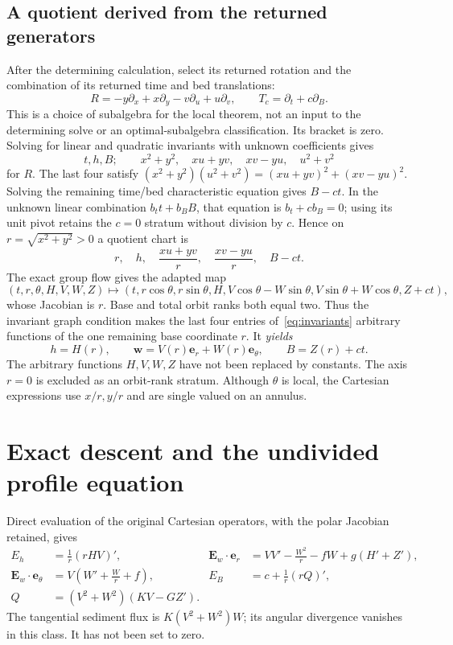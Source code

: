 \documentclass[11pt]{article}
\theoremstyle{remark}\newtheorem{remark}[theorem]{Remark}
\begin{document}
\subsection{A quotient derived from the returned generators}
After the determining calculation, select its returned rotation and the
combination of its returned time and bed translations:
\[
R=-y\partial_x+x\partial_y-v\partial_u+u\partial_v,
\qquad T_c=\partial_t+c\partial_B.
\]
This is a choice of subalgebra for the local theorem, not an input to the
determining solve or an optimal-subalgebra classification. Its bracket is zero.
Solving for linear and quadratic invariants with unknown coefficients gives
\[
t,h,B;\qquad x^2+y^2,\quad xu+yv,\quad xv-yu,\quad u^2+v^2
\]
for $R$. The last four satisfy
$(x^2+y^2)(u^2+v^2)=(xu+yv)^2+(xv-yu)^2$. Solving the remaining time/bed
characteristic equation gives $B-ct$. In the unknown linear combination
$b_t t+b_B B$, that equation is $b_t+cb_B=0$; using its unit pivot retains
the $c=0$ stratum without division by $c$.
Hence on $r=\sqrt{x^2+y^2}>0$ a quotient
chart is
\begin{equation}
r,\quad h,\quad \frac{xu+yv}{r},\quad \frac{xv-yu}{r},\quad B-ct.
\label{eq:invariants}
\end{equation}
The exact group flow gives the adapted map
\[
(t,r,\theta,H,V,W,Z)\longmapsto
(t,r\cos\theta,r\sin\theta,H,
 V\cos\theta-W\sin\theta,V\sin\theta+W\cos\theta,Z+ct),
\]
whose Jacobian is $r$. Base and total orbit ranks both equal two. Thus the
invariant graph condition makes the last four entries of~\eqref{eq:invariants}
arbitrary functions of the one remaining base coordinate $r$. It \emph{yields}
\begin{equation}
h=H(r),\qquad \mathbf w=V(r)\mathbf e_r+W(r)\mathbf e_\theta,
\qquad B=Z(r)+ct.\label{eq:derived-form}
\end{equation}
The arbitrary functions $H,V,W,Z$ have not been replaced by constants.
The axis $r=0$ is excluded as an orbit-rank stratum. Although $\theta$ is local,
the Cartesian expressions use $x/r,y/r$ and are single valued on an annulus.

\section{Exact descent and the undivided profile equation}
Direct evaluation of the original Cartesian operators, with the polar
Jacobian retained, gives
\begin{align}
E_h&=\frac{1}{r}(rHV)',&
\mathbf E_w\cdot\mathbf e_r&=VV'-\frac{W^2}{r}-fW+g(H'+Z'),\label{eq:polar1}\\
\mathbf E_w\cdot\mathbf e_\theta&=V\left(W'+\frac{W}{r}+f\right),&
E_B&=c+\frac{1}{r}(rQ)',\label{eq:polar2}\\
Q&=(V^2+W^2)(KV-GZ').&&\label{eq:q}
\end{align}
The tangential sediment flux is $K(V^2+W^2)W$; its angular divergence vanishes
in this class. It has not been set to zero.
\end{document}
